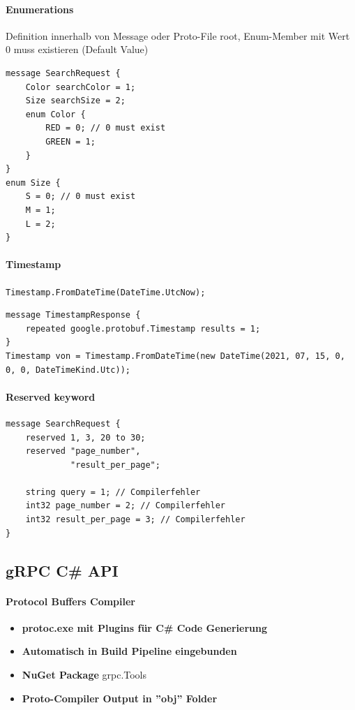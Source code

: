 \documentclass[
a4paper,
oneside,
10pt,
fleqn,
headsepline,
toc=listofnumbered, 
bibliography=totocnumbered]{scrartcl}
\begin{document}
\paragraph{Enumerations} Definition innerhalb von Message oder Proto-File root, Enum-Member mit Wert 0 muss existieren (Default Value)
\begin{lstlisting}
message SearchRequest {
    Color searchColor = 1;
    Size searchSize = 2;
    enum Color {
        RED = 0; // 0 must exist
        GREEN = 1;
    }
}
enum Size {
    S = 0; // 0 must exist
    M = 1;
    L = 2;
}
\end{lstlisting}

\paragraph{Timestamp} \lstinline{Timestamp.FromDateTime(DateTime.UtcNow);}
\begin{lstlisting}
message TimestampResponse {
    repeated google.protobuf.Timestamp results = 1;
}
Timestamp von = Timestamp.FromDateTime(new DateTime(2021, 07, 15, 0, 0, 0, DateTimeKind.Utc));
\end{lstlisting}



\paragraph{Reserved keyword}
\begin{lstlisting}
message SearchRequest {
    reserved 1, 3, 20 to 30;
    reserved "page_number",
             "result_per_page";
             
    string query = 1; // Compilerfehler
    int32 page_number = 2; // Compilerfehler
    int32 result_per_page = 3; // Compilerfehler
}
\end{lstlisting}
\subsection{gRPC C\# API}
\paragraph{Protocol Buffers Compiler}
\begin{itemize}
	\item \textbf{protoc.exe mit Plugins für C\# Code Generierung}
	\item \textbf{Automatisch in Build Pipeline eingebunden}
	\item \textbf{NuGet Package} grpc.Tools
	\item \textbf{Proto-Compiler Output in ''obj'' Folder}
\end{itemize}
\end{document}
